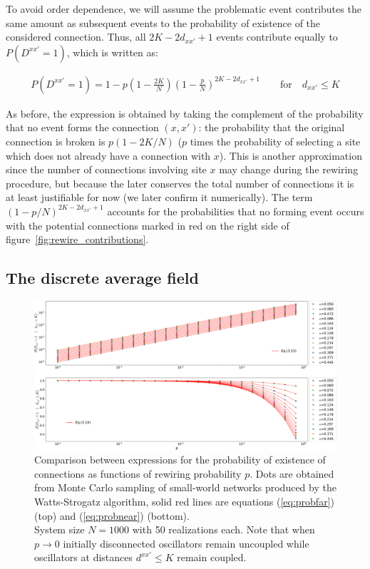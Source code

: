 To avoid order dependence, we will assume the problematic event contributes the same amount as subsequent events to the probability of
existence of the considered connection. Thus, all $2K-2d_{xx'}+1$ events contribute equally to $P(D^{xx'}=1)$, which is written as:

\begin{align}
  P(D^{xx'}=1) = 1 - p\left(1-\frac{2K}{N}\right)\left(1-\frac{p}{N}\right)^{2K - 2d_{xx'} + 1} \qquad \text{for} \quad d_{xx'} \leq K
  \label{eq:probnear}
\end{align}

\noindent As before, the expression is obtained by taking the complement of the probability that no event forms the connection
$(x,x')$: the probability that the original connection is broken is $p(1-2K/N)$ ($p$ times the probability of selecting a site which
does not already have a connection with $x$). This is another approximation since the number of connections involving site $x$ may
change during the rewiring procedure, but because the later conserves the total number of connections it is at least justifiable for
now (we later confirm it numerically). The term $(1-p/N)^{2K-2d_{xx'}+1}$ accounts for the probabilities that no forming event occurs
with the potential connections marked in {\color{red}red} on the right side of figure~\ref{fig:rewire_contributions}.

\subsection{The discrete average field}
\label{subsection:justifyapproximations}

\begin{figure}
  \centering
  \includegraphics[width=\linewidth]{fig/rewire_mc.png}
  \caption{Comparison between expressions for the probability of existence of connections as functions of rewiring probability $p$.
    Dots are obtained from Monte Carlo sampling of small-world networks produced by the Watts-Strogatz algorithm, solid red lines are
    equations (\ref{eq:probfar}) (top) and (\ref{eq:probnear}) (bottom). \\ System size $N=1000$ with 50 realizations each. Note that
    when $p\to 0$ initially disconnected oscillators remain uncoupled while oscillators at distances $d^{xx'}\leq K$ remain coupled.}

  \label{fig:rewire_mc}
\end{figure}

